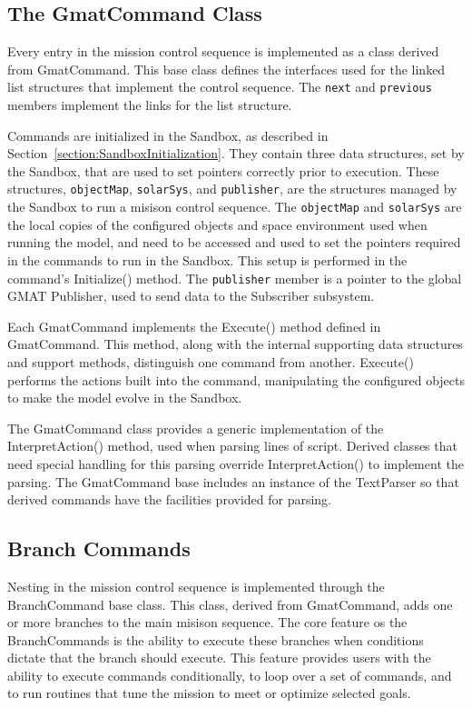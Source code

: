 \subsection{The GmatCommand Class}

Every entry in the mission control sequence is implemented as a class derived from GmatCommand.
This base class defines the interfaces used for the linked list structures that implement the
control sequence.  The \texttt{next} and \texttt{previous} members implement the links for the list
structure.

Commands are initialized in the Sandbox, as described in
Section~\ref{section:SandboxInitialization}.  They contain three data structures, set by the
Sandbox, that are used to set pointers correctly prior to execution.  These structures,
\texttt{objectMap}, \texttt{solarSys}, and \texttt{publisher}, are the structures managed by the
Sandbox to run a misison control sequence.  The \texttt{objectMap} and \texttt{solarSys} are the
local copies of the configured objects and space environment used when running the model, and need
to be accessed and used to set the pointers required in the commands to run in the Sandbox.  This
setup is performed in the command's Initialize() method.  The \texttt{publisher} member is a
pointer to the global GMAT Publisher, used to send data to the Subscriber subsystem.

Each GmatCommand implements the Execute() method defined in GmatCommand.  This method, along with
the internal supporting data structures and support methods, distinguish one command from another.
Execute() performs the actions built into the command, manipulating the configured objects to make
the model evolve in the Sandbox.

The GmatCommand class provides a generic implementation of the InterpretAction() method, used when
parsing lines of script.  Derived classes that need special handling for this parsing override
InterpretAction() to implement the parsing.  The GmatCommand base includes an instance of the
TextParser so that derived commands have the facilities provided for parsing.

\subsection{Branch Commands}

Nesting in the mission control sequence is implemented through the BranchCommand base class.  This
class, derived from GmatCommand, adds one or more branches to the main misison sequence.  The core
feature os the BranchCommands is the ability to execute these branches when conditions dictate that
the branch should execute.  This feature provides users with the ability to execute commands
conditionally, to loop over a set of commands, and to run routines that tune the mission to meet or
optimize selected goals.

